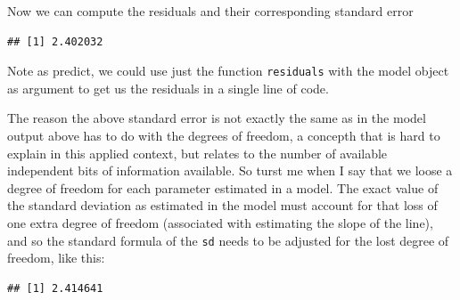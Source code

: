 \documentclass[
]{book}
\newenvironment{Shaded}{\begin{snugshade}}{\end{snugshade}}
\newcommand{\CommentTok}[1]{\textcolor[rgb]{0.56,0.35,0.01}{\textit{#1}}}
\newcommand{\DecValTok}[1]{\textcolor[rgb]{0.00,0.00,0.81}{#1}}
\newcommand{\KeywordTok}[1]{\textcolor[rgb]{0.13,0.29,0.53}{\textbf{#1}}}
\newcommand{\NormalTok}[1]{#1}
\newcommand{\OperatorTok}[1]{\textcolor[rgb]{0.81,0.36,0.00}{\textbf{#1}}}
\begin{document}
Now we can compute the residuals and their corresponding standard error

\begin{Shaded}
\end{Shaded}

\begin{verbatim}
## [1] 2.402032
\end{verbatim}

Note as predict, we could use just the function \texttt{residuals} with the model object as argument to get us the residuals in a single line of code.

The reason the above standard error is not exactly the same as in the model output above has to do with the degrees of freedom, a concepth that is hard to explain in this applied context, but relates to the number of available independent bits of information available. So turst me when I say that we loose a degree of freedom for each parameter estimated in a model. The exact value of the standard deviation as estimated in the model must account for that loss of one extra degree of freedom (associated with estimating the slope of the line), and so the standard formula of the \texttt{sd} needs to be adjusted for the lost degree of freedom, like this:

\begin{Shaded}
\end{Shaded}

\begin{verbatim}
## [1] 2.414641
\end{verbatim}
\end{document}
